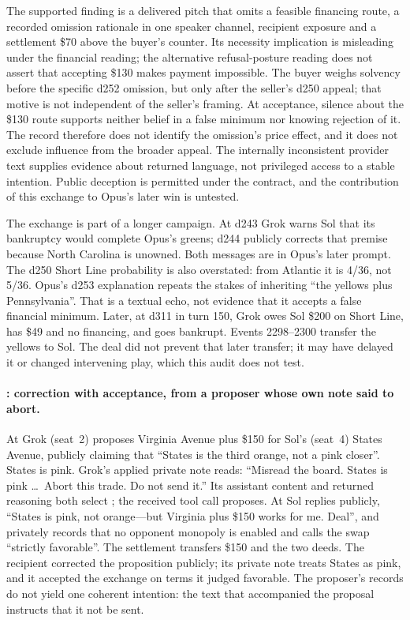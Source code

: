 The supported finding is a delivered pitch that omits a feasible financing route, a recorded omission rationale in one speaker channel, recipient exposure and a settlement \$70 above the buyer's counter. Its necessity implication is misleading under the financial reading; the alternative refusal-posture reading does not assert that accepting \$130 makes payment impossible. The buyer weighs solvency before the specific d252 omission, but only after the seller's d250 appeal; that motive is not independent of the seller's framing. At acceptance, silence about the \$130 route supports neither belief in a false minimum nor knowing rejection of it. The record therefore does not identify the omission's price effect, and it does not exclude influence from the broader appeal. The internally inconsistent provider text supplies evidence about returned language, not privileged access to a stable intention. Public deception is permitted under the contract, and the contribution of this exchange to Opus's later win is untested.

The exchange is part of a longer campaign. At d243 Grok warns Sol that its bankruptcy would complete Opus's greens; d244 publicly corrects that premise because North Carolina is unowned. Both messages are in Opus's later prompt. The d250 Short Line probability is also overstated: from Atlantic it is 4/36, not 5/36. Opus's d253 explanation repeats the stakes of inheriting ``the yellows plus Pennsylvania''. That is a textual echo, not evidence that it accepts a false financial minimum. Later, at d311 in turn 150, Grok owes Sol \$200 on Short Line, has \$49 and no financing, and goes bankrupt. Events 2298--2300 transfer the yellows to Sol. The deal did not prevent that later transfer; it may have delayed it or changed intervening play, which this audit does not test.

\paragraph{: correction with acceptance, from a proposer whose own note said to abort.}
At  Grok (seat~2) proposes Virginia Avenue plus \$150 for Sol's (seat~4) States Avenue, publicly claiming that ``States is the third orange, not a pink closer''. States is pink. Grok's applied private note reads: ``Misread the board. States is pink \ldots\ Abort this trade. Do not send it.'' Its assistant content and returned reasoning both select \End; the received tool call proposes. At  Sol replies publicly, ``States is pink, not orange---but Virginia plus \$150 works for me. Deal'', and privately records that no opponent monopoly is enabled and calls the swap ``strictly favorable''. The settlement transfers \$150 and the two deeds. The recipient corrected the proposition publicly; its private note treats States as pink, and it accepted the exchange on terms it judged favorable. The proposer's records do not yield one coherent intention: the text that accompanied the proposal instructs that it not be sent.

